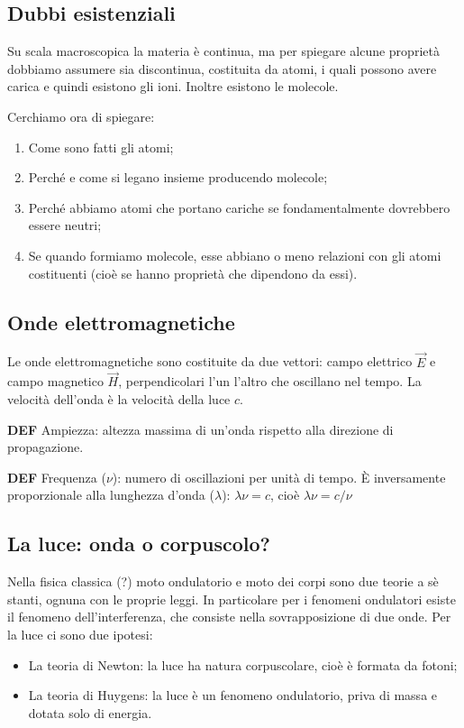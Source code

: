 \subsection{Dubbi esistenziali}
Su scala macroscopica la materia è continua, ma per spiegare alcune proprietà dobbiamo assumere sia discontinua, costituita da atomi, i quali possono avere carica e quindi esistono gli ioni. Inoltre esistono le molecole.

Cerchiamo ora di spiegare:
\begin{enumerate}
    \item Come sono fatti gli atomi;
    \item Perché e come si legano insieme producendo molecole;
    \item Perché abbiamo atomi che portano cariche se fondamentalmente dovrebbero essere neutri;
    \item Se quando formiamo molecole, esse abbiano o meno relazioni con gli atomi costituenti (cioè se hanno proprietà che dipendono da essi).
  \end{enumerate}
  
  \subsection{Onde elettromagnetiche}
Le onde elettromagnetiche sono costituite da due vettori: campo elettrico $\vec{E}$ e campo magnetico $\vec{H}$, perpendicolari l'un l'altro che oscillano nel tempo. La velocità dell'onda è la velocità della luce $c$.

\textbf{DEF} Ampiezza: altezza massima di un'onda rispetto alla direzione di propagazione. 

\textbf{DEF} Frequenza ($\nu$): numero di oscillazioni per unità di tempo. È inversamente proporzionale alla lunghezza d'onda ($\lambda$): $\lambda\nu=c$, cioè $\lambda\nu=c/\nu$

\subsection{La luce: onda o corpuscolo?}
Nella fisica classica (?) moto ondulatorio e moto dei corpi sono due teorie a sè stanti, ognuna con le proprie leggi.
In particolare per i fenomeni ondulatori esiste il fenomeno dell'interferenza, che consiste nella sovrapposizione di due onde.
Per la luce ci sono due ipotesi:
\begin{itemize}
  \item  La teoria di Newton: la luce ha natura corpuscolare, cioè è formata da fotoni;
  \item  La teoria di Huygens: la luce è un fenomeno ondulatorio, priva di massa e dotata solo di energia.
\end{itemize}
